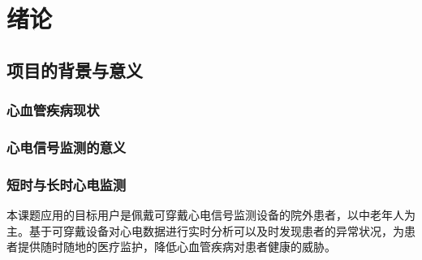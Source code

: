\documentclass{ecnuthesis}
\begin{document}
    \frontmatter

    \begin{abstract}
    \end{abstract}

    \begin{abstractEN}
    \end{abstractEN}

    \mainmatter


    \chapter{绪论}\label{ch:intro}


    \section{项目的背景与意义}\label{sec:background}

    \subsection{心血管疾病现状}\label{subsec:disease}

    \subsection{心电信号监测的意义}\label{subsec:significance}

    \subsection{短时与长时心电监测}\label{subsec:short-long}


    本课题应用的目标用户是佩戴可穿戴心电信号监测设备的院外患者，以中老年人为主。基于可穿戴设备对心电数据进行实时分析可以及时发现患者的异常状况，为患者提供随时随地的医疗监护，降低心血管疾病对患者健康的威胁。
\end{document}
